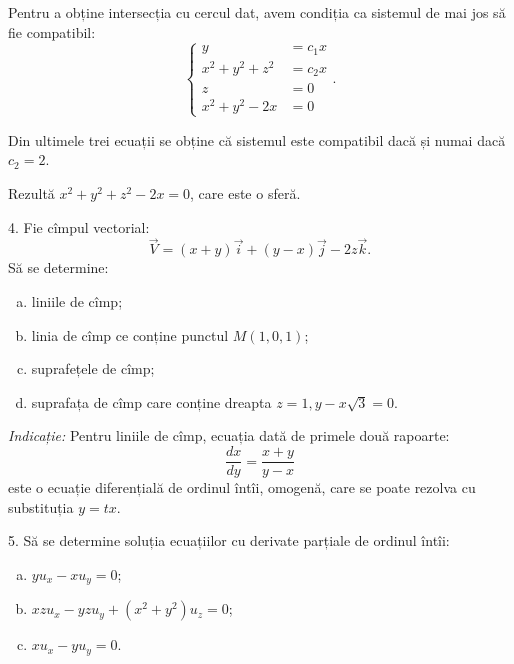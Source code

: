 Pentru a obține intersecția cu cercul dat, avem condiția ca sistemul de mai jos să fie
compatibil:
\[
  \begin{cases}
    y &= c_1 x \\
    x^2 + y^2 + z^2 &= c_2 x \\
    z &= 0 \\
    x^2 + y^2 - 2x &= 0
  \end{cases}.
\]

Din ultimele trei ecuații se obține că sistemul este compatibil dacă și numai dacă $ c_2 = 2 $.

Rezultă $ x^2 + y^2 + z^2 - 2x = 0 $, care este o sferă.

\vspace{1cm}

4. Fie cîmpul vectorial:
\[
  \vec{V} = (x + y)\vec{i} + (y - x)\vec{j} - 2z\vec{k}.
\]
Să se determine:
\begin{enumerate}[(a)]
\item liniile de cîmp;
\item linia de cîmp ce conține punctul $ M(1, 0, 1) $;
\item suprafețele de cîmp;
\item suprafața de cîmp care conține dreapta $ z = 1, y - x\sqrt{3} = 0 $.
\end{enumerate}

\emph{Indicație:} Pentru liniile de cîmp, ecuația dată de primele două rapoarte:
\[
  \dfrac{dx}{dy} = \dfrac{x + y}{y - x}
\]
este o ecuație diferențială de ordinul întîi, omogenă, care se poate rezolva cu
substituția $ y = tx $.

\vspace{1cm}

5. Să se determine soluția ecuațiilor cu derivate parțiale de ordinul întîi:
\begin{enumerate}[(a)]
\item $ y u_x - x u_y = 0 $;
\item $ xz u_x - yz u_y + (x^2 + y^2) u_z = 0 $;
\item $ x u_x - y u_y = 0 $.
\end{enumerate}


